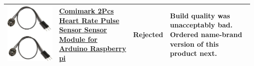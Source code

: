 \documentclass[12pt, titlepage]{article}
\begin{document}
\begin{table}[H]
\begin{tabular}{ | c | m{3cm} | c | m{7cm} |}
\hline
\includegraphics[scale = 0.1]{knockoff} & \href{https://www.amazon.ca/Comimark-Sensor-Module-Arduino-Raspberry/dp/B07V6VV8CM}{Comimark 2Pcs Heart Rate Pulse Sensor Sensor Module for Arduino Raspberry pi}  & Rejected & Build quality was unacceptably bad. Ordered name-brand version of this product next.\\
\hline


\end{tabular}
\end{table}
\end{document}
